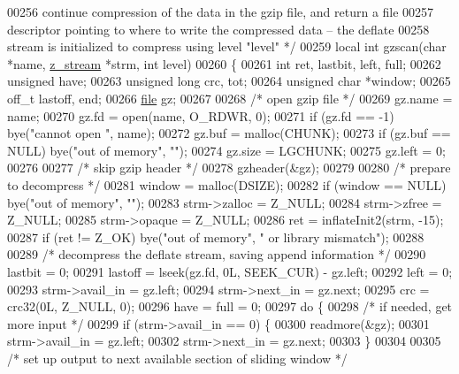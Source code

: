 \begin{DoxyCode}
{00256 \textcolor{comment}{   continue compression of the data in the gzip file, and return a file}
00257 \textcolor{comment}{   descriptor pointing to where to write the compressed data -- the deflate}
00258 \textcolor{comment}{   stream is initialized to compress using level "level" */}
00259 local \textcolor{keywordtype}{int} gzscan(\textcolor{keywordtype}{char} *name, \hyperlink{structz__stream__s}{z\_stream} *strm, \textcolor{keywordtype}{int} level)
00260 \{
00261     \textcolor{keywordtype}{int} ret, lastbit, left, full;
00262     \textcolor{keywordtype}{unsigned} have;
00263     \textcolor{keywordtype}{unsigned} \textcolor{keywordtype}{long} crc, tot;
00264     \textcolor{keywordtype}{unsigned} \textcolor{keywordtype}{char} *window;
00265     off\_t lastoff, end;
00266     \hyperlink{structfile}{file} gz;
00267 
00268     \textcolor{comment}{/* open gzip file */}
00269     gz.name = name;
00270     gz.fd = open(name, O\_RDWR, 0);
00271     \textcolor{keywordflow}{if} (gz.fd == -1) bye(\textcolor{stringliteral}{"cannot open "}, name);
00272     gz.buf = malloc(CHUNK);
00273     \textcolor{keywordflow}{if} (gz.buf == NULL) bye(\textcolor{stringliteral}{"out of memory"}, \textcolor{stringliteral}{""});
00274     gz.size = LGCHUNK;
00275     gz.left = 0;
00276 
00277     \textcolor{comment}{/* skip gzip header */}
00278     gzheader(&gz);
00279 
00280     \textcolor{comment}{/* prepare to decompress */}
00281     window = malloc(DSIZE);
00282     \textcolor{keywordflow}{if} (window == NULL) bye(\textcolor{stringliteral}{"out of memory"}, \textcolor{stringliteral}{""});
00283     strm->zalloc = Z\_NULL;
00284     strm->zfree = Z\_NULL;
00285     strm->opaque = Z\_NULL;
00286     ret = inflateInit2(strm, -15);
00287     \textcolor{keywordflow}{if} (ret != Z\_OK) bye(\textcolor{stringliteral}{"out of memory"}, \textcolor{stringliteral}{" or library mismatch"});
00288 
00289     \textcolor{comment}{/* decompress the deflate stream, saving append information */}
00290     lastbit = 0;
00291     lastoff = lseek(gz.fd, 0L, SEEK\_CUR) - gz.left;
00292     left = 0;
00293     strm->avail\_in = gz.left;
00294     strm->next\_in = gz.next;
00295     crc = crc32(0L, Z\_NULL, 0);
00296     have = full = 0;
00297     \textcolor{keywordflow}{do} \{
00298         \textcolor{comment}{/* if needed, get more input */}
00299         \textcolor{keywordflow}{if} (strm->avail\_in == 0) \{
00300             readmore(&gz);
00301             strm->avail\_in = gz.left;
00302             strm->next\_in = gz.next;
00303         \}
00304 
00305         \textcolor{comment}{/* set up output to next available section of sliding window */}
}
\end{DoxyCode}
